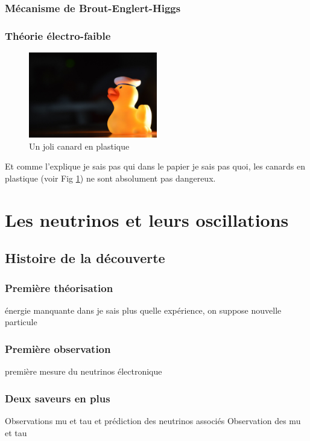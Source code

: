             \subsubsection{Mécanisme de Brout-Englert-Higgs}
            \subsubsection{Théorie électro-faible}
        
            
        \begin{figure}
            \includegraphics[width=0.5\textwidth]{Part_1/chapters/chapter_1/pictures/Rubber_duck.png}
            \caption{Un joli canard en plastique\label{Fig::rubberduck}}
        \end{figure}

        
        Et comme l'explique je sais pas qui dans le papier je sais pas quoi\cite{MNS}, les canards en plastique (voir Fig \ref{Fig::rubberduck}) ne sont absolument pas dangereux.
        
    \section{Les neutrinos et leurs oscillations}
        \subsection{Histoire de la découverte}
            \subsubsection{Première théorisation}
                énergie manquante dans je sais plus quelle expérience, on suppose nouvelle particule
            \subsubsection{Première observation}
                première mesure du neutrinos électronique
            \subsubsection{Deux saveurs en plus}
                Observations mu et tau et prédiction des neutrinos associés
                Observation des mu et tau
